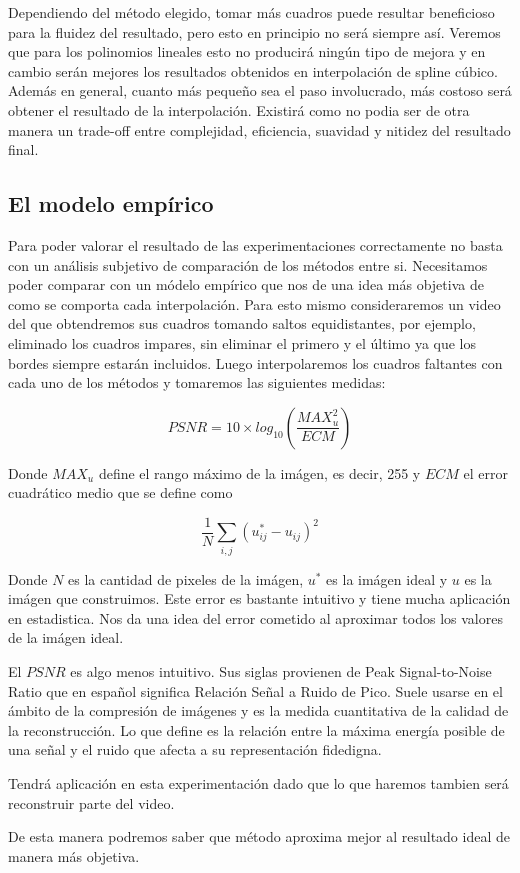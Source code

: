 Dependiendo del método elegido, tomar más cuadros puede resultar beneficioso para la fluidez del resultado, pero esto en principio no será siempre así. Veremos que para los polinomios lineales esto no producirá ningún tipo de mejora y en cambio serán mejores los resultados obtenidos en interpolación de spline cúbico. Además en general, cuanto más pequeño sea el paso involucrado, más costoso será obtener el resultado de la interpolación. Existirá como no podia ser de otra manera un trade-off entre complejidad, eficiencia, suavidad y nitidez del resultado final. 
 
\subsection{El modelo empírico}

Para poder valorar el resultado de las experimentaciones correctamente no basta con un análisis subjetivo de comparación de los métodos entre si. Necesitamos poder comparar con un módelo empírico que nos de una idea más objetiva de como se comporta cada interpolación. Para esto mismo consideraremos un video del que obtendremos sus cuadros tomando saltos equidistantes, por ejemplo, eliminado los cuadros impares, sin eliminar el primero y el último ya que los bordes siempre estarán incluidos. Luego interpolaremos los cuadros faltantes con cada uno de los métodos y tomaremos las siguientes medidas:

\begin{equation}
	PSNR = 10 \times log_{10}(\dfrac{MAX_u^2}{ECM})
\end{equation}

Donde $MAX_u$ define el rango máximo de la imágen, es decir, 255 y $ECM$ el error cuadrático medio que se define como

\begin{equation}
	\dfrac{1}{N}\sum_{i,j}(u_{ij}^* - u_{ij})^2
\end{equation}

Donde $N$ es la cantidad de pixeles de la imágen, $u^*$ es la imágen ideal y $u$ es la imágen que construimos. Este error es bastante intuitivo y tiene mucha aplicación en estadistica. Nos da una idea del error cometido al aproximar todos los valores de la imágen ideal. 

El $PSNR$ es algo menos intuitivo. Sus siglas provienen de Peak Signal-to-Noise Ratio que en español significa Relación Señal a Ruido de Pico. Suele usarse en el ámbito de la compresión de imágenes y es la medida cuantitativa de la calidad de la reconstrucción. Lo que define es la relación entre la máxima energía posible de una señal y el ruido que afecta a su representación fidedigna. 

Tendrá aplicación en esta experimentación dado que lo que haremos tambien será reconstruir parte del video.

De esta manera podremos saber que método aproxima mejor al resultado ideal de manera más objetiva. 












